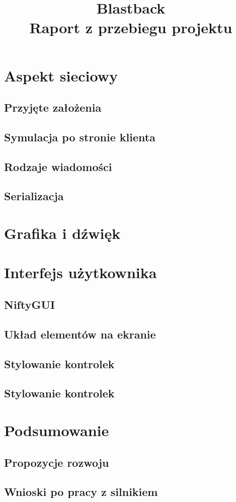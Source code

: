 \documentclass[]{report}
\begin{document}
\title{Blastback \\
	\Large Raport z przebiegu projektu}
\maketitle



\chapter*{Aspekt sieciowy}
\section{Przyjęte założenia}
\section{Symulacja po stronie klienta}
\section{Rodzaje wiadomości}
\section{Serializacja}



\chapter*{Grafika i dźwięk}



\chapter*{Interfejs użytkownika}
\section{NiftyGUI}
\section{Układ elementów na ekranie}
\section{Stylowanie kontrolek}
\section{Stylowanie kontrolek}



\chapter*{Podsumowanie}
\section{Propozycje rozwoju}
\section{Wnioski po pracy z silnikiem}
\end{document}
